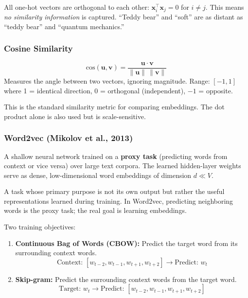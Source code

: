 \documentclass[11pt, a4paper]{article}
\begin{document}
\begin{warnbox}
All one-hot vectors are orthogonal to each other: $\mathbf{x}_i^\top \mathbf{x}_j = 0$ for $i \neq j$. This means \emph{no similarity information} is captured. ``Teddy bear'' and ``soft'' are as distant as ``teddy bear'' and ``quantum mechanics.''
\end{warnbox}

\subsubsection{Cosine Similarity}

\begin{defbox}
\[
\text{cos}(\mathbf{u}, \mathbf{v}) = \frac{\mathbf{u} \cdot \mathbf{v}}{\|\mathbf{u}\| \, \|\mathbf{v}\|}
\]
Measures the angle between two vectors, ignoring magnitude. Range: $[-1, 1]$ where 1 = identical direction, 0 = orthogonal (independent), $-1$ = opposite.
\end{defbox}

This is the standard similarity metric for comparing embeddings. The dot product alone is also used but is scale-sensitive.

\subsubsection{Word2vec (Mikolov et al., 2013)}

\begin{defbox}
A shallow neural network trained on a \textbf{proxy task} (predicting words from context or vice versa) over large text corpora. The learned hidden-layer weights serve as dense, low-dimensional word embeddings of dimension $d \ll V$.
\end{defbox}

\begin{defbox}
A task whose primary purpose is not its own output but rather the useful representations learned during training. In Word2vec, predicting neighboring words is the proxy task; the real goal is learning embeddings.
\end{defbox}

Two training objectives:

\begin{enumerate}[leftmargin=2em]
  \item \textbf{Continuous Bag of Words (CBOW):} Predict the target word from its surrounding context words.
  \[
  \text{Context: } [w_{t-2}, w_{t-1}, w_{t+1}, w_{t+2}] \to \text{Predict: } w_t
  \]
  \item \textbf{Skip-gram:} Predict the surrounding context words from the target word.
  \[
  \text{Target: } w_t \to \text{Predict: } [w_{t-2}, w_{t-1}, w_{t+1}, w_{t+2}]
  \]
\end{enumerate}
\end{document}
